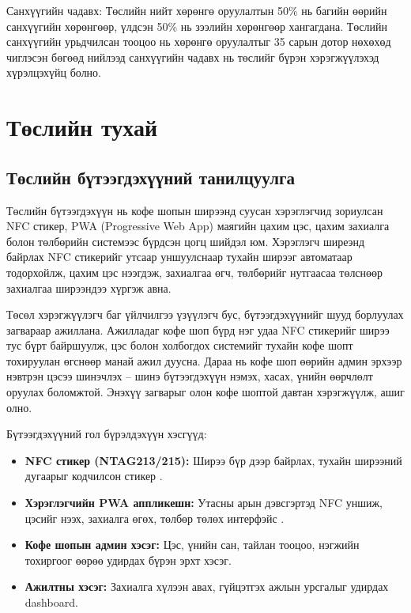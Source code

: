 Санхүүгийн чадавх: Төслийн нийт хөрөнгө оруулалтын 50\% нь багийн
өөрийн санхүүгийн хөрөнгөөр, үлдсэн 50\% нь зээлийн хөрөнгөөр
хангагдана. Төслийн санхүүгийн урьдчилсан тооцоо нь хөрөнгө
оруулалтыг 35 сарын дотор нөхөхөд чиглэсэн бөгөөд нийлээд
санхүүгийн чадавх нь төслийг бүрэн хэрэгжүүлэхэд хүрэлцэхүйц болно.

\section{Төслийн тухай}

\subsection{Төслийн бүтээгдэхүүний танилцуулга}

Төслийн бүтээгдэхүүн нь кофе шопын ширээнд суусан хэрэглэгчид зориулсан
NFC стикер, PWA (Progressive Web App) маягийн цахим цэс, цахим
захиалга болон төлбөрийн системээс бүрдсэн цогц шийдэл юм. Хэрэглэгч
ширеэнд байрлах NFC стикерийг утсаар уншуулснаар тухайн ширээг
автоматаар тодорхойлж, цахим цэс нээгдэж, захиалгаа өгч, төлбөрийг
нутгаасаа төлснөөр захиалгаа ширээндээ хүргэж авна.

Төсөл хэрэгжүүлэгч баг үйлчилгээ үзүүлэгч бус, бүтээгдэхүүнийг шууд
борлуулах загвараар ажиллана. Ажилладаг кофе шоп бүрд нэг удаа
NFC стикерийг ширээ тус бүрт байршуулж, цэс болон холбогдох
системийг тухайн кофе шопт тохируулан өгснөөр манай ажил дуусна.
Дараа нь кофе шоп өөрийн админ эрхээр нэвтрэн цэсээ шинэчлэх --
шинэ бүтээгдэхүүн нэмэх, хасах, үнийн өөрчлөлт оруулах боломжтой.
Энэхүү загварыг олон кофе шоптой давтан хэрэгжүүлж, ашиг олно.

Бүтээгдэхүүний гол бүрэлдэхүүн хэсгүүд:

\begin{itemize}
  \item \textbf{NFC стикер (NTAG213/215):} Ширээ бүр дээр байрлах, тухайн
        ширээний дугаарыг кодчилсон стикер \cite{nxpntag}.
  \item \textbf{Хэрэглэгчийн PWA аппликешн:} Утасны арын дэвсгэртэд NFC
        уншиж, цэсийг нээх, захиалга өгөх, төлбөр төлөх интерфэйс \cite{androidnfc, corenfc}.
  \item \textbf{Кофе шопын админ хэсэг:} Цэс, үнийн сан, тайлан тооцоо,
        нэгжийн тохиргоог өөрөө удирдах бүрэн эрхт хэсэг.
  \item \textbf{Ажилтны хэсэг:} Захиалга хүлээн авах, гүйцэтгэх
        ажлын урсгалыг удирдах dashboard.
\end{itemize}

